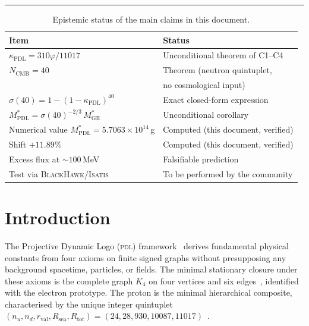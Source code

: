 \documentclass[12pt, a4paper]{article}
\theoremstyle{definition}
\newcommand{\PDL}{\textsc{pdl}}
\newcommand{\Rtot}{R_{\mathrm{tot}}}
\newcommand{\Nsea}{R_{\mathrm{sea}}}
\newcommand{\rval}{r_{\mathrm{val}}}
\newcommand{\kappaPDL}{\kappa_{\mathrm{PDL}}}
\newcommand{\MstarGR}{M^{*}_{\mathrm{GR}}}
\newcommand{\MstarPDL}{M^{*}_{\mathrm{PDL}}}
\newcommand{\NCMB}{N_{\mathrm{CMB}}}
\newcommand{\phigold}{\varphi}
\begin{document}
\clearpage

\vspace{6pt}
\hrule
\vspace{14pt}

\begin{table}[h]
\centering
\small
\begin{tabular}{ll}
\toprule
\textbf{Item} & \textbf{Status} \\
\midrule
$\kappaPDL = 310\phigold/11017$ & Unconditional theorem of C1--C4~\cite{D39,D42} \\
$\NCMB = 40$ & Theorem (neutron quintuplet, \\ & no cosmological input)~\cite{D27} \\
$\sigma(40) = 1-(1-\kappaPDL)^{40}$ & Exact closed-form expression \\
$\MstarPDL = \sigma(40)^{-2/3}\,\MstarGR$ & Unconditional corollary~\cite{D38} \\
Numerical value $\MstarPDL = 5.7063\times10^{14}$\,g & Computed (this document, verified) \\
Shift $+11.89\%$ & Computed (this document, verified) \\
Excess flux at $\sim 100$\,MeV & Falsifiable prediction \\
Test via \textsc{BlackHawk}/\textsc{Isatis} & To be performed by the community \\
\bottomrule
\end{tabular}
\caption{Epistemic status of the main claims in this document.}
\label{tab:epistemic}
\end{table}

\tableofcontents

\newpage

\section{Introduction}

The Projective Dynamic Logo (\PDL) framework~\cite{D01,D02} derives fundamental physical constants from four axioms on finite signed graphs without presupposing any background spacetime, particles, or fields. The minimal stationary closure under these axioms is the complete graph $K_4$ on four vertices and six edges~\cite{D16a}, identified with the electron prototype. The proton is the minimal hierarchical composite, characterised by the unique integer quintuplet $(n_u, n_d, \rval, \Nsea, \Rtot) = (24, 28, 930, 10087, 11017)$~\cite{D16b,D29}.
\end{document}
